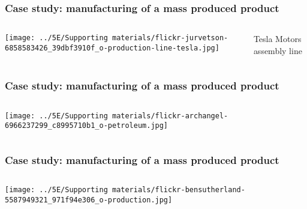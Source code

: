 \begin{frame}\frametitle{Case study: manufacturing of a mass produced product}
	\begin{columns}[b]
				\centerline{\texttt{[image: ../5E/Supporting materials/flickr-jurvetson-6858583426\_39dbf3910f\_o-production-line-tesla.jpg]}}
			Tesla Motors assembly line
	\end{columns}
\end{frame}

\begin{frame}\frametitle{Case study: manufacturing of a mass produced product}
	\begin{columns}[b]
 				\centerline{\texttt{[image: ../5E/Supporting materials/flickr-archangel-6966237299\_c8995710b1\_o-petroleum.jpg]}}


	\end{columns}
\end{frame}
	
\begin{frame}\frametitle{Case study: manufacturing of a mass produced product}
	\begin{columns}[b]
				\centerline{\texttt{[image: ../5E/Supporting materials/flickr-bensutherland-5587949321\_971f94e306\_o-production.jpg]}}

	\end{columns}
\end{frame}


